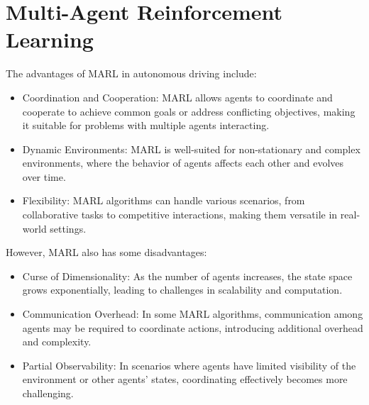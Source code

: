 \section{Multi-Agent Reinforcement Learning}\label{sec:multi-agent-reinforcement-learning}
The advantages of MARL in autonomous driving include:
\begin{itemize}
    \item Coordination and Cooperation: MARL allows agents to coordinate and cooperate to achieve common goals or address conflicting objectives, making it suitable for problems with multiple agents interacting.
    \item Dynamic Environments: MARL is well-suited for non-stationary and complex environments, where the behavior of agents affects each other and evolves over time.
    \item Flexibility: MARL algorithms can handle various scenarios, from collaborative tasks to competitive interactions, making them versatile in real-world settings.
\end{itemize}
However, MARL also has some disadvantages:
\begin{itemize}
    \item Curse of Dimensionality: As the number of agents increases, the state space grows exponentially, leading to challenges in scalability and computation.
    \item Communication Overhead: In some MARL algorithms, communication among agents may be required to coordinate actions, introducing additional overhead and complexity.
    \item Partial Observability: In scenarios where agents have limited visibility of the environment or other agents' states, coordinating effectively becomes more challenging.
\end{itemize}